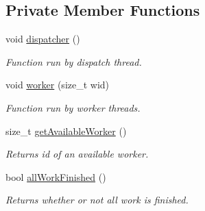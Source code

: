 \subsection*{Private Member Functions}
\begin{DoxyCompactItemize}
\item 
void \hyperlink{classnta_1_1ThreadPool_ad439d625834a107a84c62c1ddcf2e936}{dispatcher} ()
\begin{DoxyCompactList}\small\item\em Function run by dispatch thread. \end{DoxyCompactList}\item 
\mbox{\label{classnta_1_1ThreadPool_a385efaf5c22285933433fed27e395500}} 
void \hyperlink{classnta_1_1ThreadPool_a385efaf5c22285933433fed27e395500}{worker} (size\+\_\+t wid)
\begin{DoxyCompactList}\small\item\em Function run by worker threads. \end{DoxyCompactList}\item 
\mbox{\label{classnta_1_1ThreadPool_a20591ee4c43620103d30ab786336c55f}} 
size\+\_\+t \hyperlink{classnta_1_1ThreadPool_a20591ee4c43620103d30ab786336c55f}{get\+Available\+Worker} ()
\begin{DoxyCompactList}\small\item\em Returns id of an available worker. \end{DoxyCompactList}\item 
\mbox{\label{classnta_1_1ThreadPool_a1931cc30b7621daa103cb9c4576c6413}} 
bool \hyperlink{classnta_1_1ThreadPool_a1931cc30b7621daa103cb9c4576c6413}{all\+Work\+Finished} ()
\begin{DoxyCompactList}\small\item\em Returns whether or not all work is finished. \end{DoxyCompactList}\end{DoxyCompactItemize}
